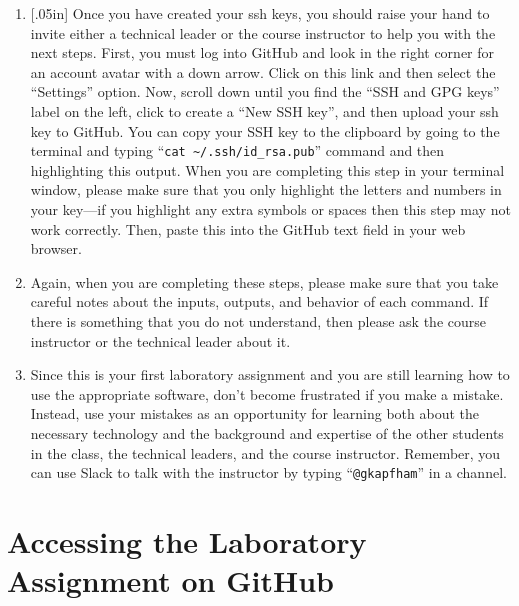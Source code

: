 \documentclass[11pt]{article}
\newcommand{\command}[1]{``\lstinline{#1}''}
\newcommand{\caution}[1]{\null\hfill\LARGE{\faWarning{}}\newline\scriptsize{\em{#1}}}
\begin{document}
\begin{enumerate}
  \item \marginnote{\caution{Upload keys correctly}}[.05in] Once you have
    created your ssh keys, you should raise your hand to invite either a
    technical leader or the course instructor to help you with the next steps.
    First, you must log into GitHub and look in the right corner for an account
    avatar with a down arrow. Click on this link and then select the
    ``Settings'' option. Now, scroll down until you find the ``SSH and GPG
    keys'' label on the left, click to create a ``New SSH key'', and then upload
    your ssh key to GitHub. You can copy your SSH key to the clipboard by going
    to the terminal and typing ``{\tt cat \textasciitilde{}/.ssh/id\_rsa.pub}''
    command and then highlighting this output. When you are completing this step
    in your terminal window, please make sure that you only highlight the
    letters and numbers in your key---if you highlight any extra symbols or
    spaces then this step may not work correctly. Then, paste this into the
    GitHub text field in your web browser.

  \item Again, when you are completing these steps, please make sure that you
    take careful notes about the inputs, outputs, and behavior of each command.
    If there is something that you do not understand, then please ask the course
    instructor or the technical leader about it.

  \item Since this is your first laboratory assignment and you are still
    learning how to use the appropriate software, don't become frustrated if you
    make a mistake. Instead, use your mistakes as an opportunity for learning
    both about the necessary technology and the background and expertise of the
    other students in the class, the technical leaders, and the course
    instructor. Remember, you can use Slack to talk with the instructor by
    typing \command{@gkapfham} in a channel.

\end{enumerate}

\section*{Accessing the Laboratory Assignment on GitHub}
\end{document}
